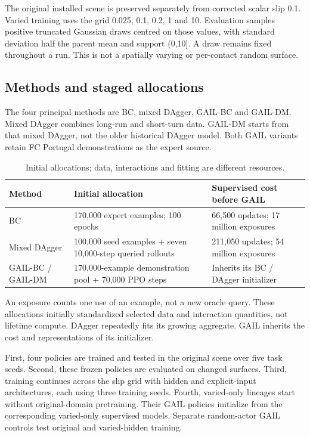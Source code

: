 \documentclass[conference]{IEEEtran}
\begin{document}
The original installed scene is preserved separately from corrected scalar slip 0.1. Varied training uses the grid 0.025, 0.1, 0.2, 1 and 10. Evaluation samples positive truncated Gaussian draws centred on those values, with standard deviation half the parent mean and support (0,10]. A draw remains fixed throughout a run. This is not a spatially varying or per-contact random surface.

\subsection{Methods and staged allocations}

The four principal methods are BC, mixed DAgger, GAIL-BC and GAIL-DM. Mixed DAgger combines long-run and short-turn data. GAIL-DM starts from that mixed DAgger, not the older historical DAgger model. Both GAIL variants retain FC Portugal demonstrations as the expert source.

\begin{table}[t]\centering\small
\caption{Initial allocations; data, interactions and fitting are different resources.}
\begin{tabularx}{\textwidth}{lXX}\toprule
Method & Initial allocation & Supervised cost before GAIL \\
\midrule
BC & 170,000 expert examples; 100 epochs & 66,500 updates; 17 million exposures \\
Mixed DAgger & 100,000 seed examples + seven 10,000-step queried rollouts & 211,050 updates; 54 million exposures \\
GAIL-BC / GAIL-DM & 170,000-example demonstration pool + 70,000 PPO steps & Inherits its BC / DAgger initializer \\
\bottomrule\end{tabularx}\end{table}

An exposure counts one use of an example, not a new oracle query. These allocations initially standardized selected data and interaction quantities, not lifetime compute. DAgger repeatedly fits its growing aggregate. GAIL inherits the cost and representations of its initializer.

First, four policies are trained and tested in the original scene over five task seeds. Second, these frozen policies are evaluated on changed surfaces. Third, training continues across the slip grid with hidden and explicit-input architectures, each using three training seeds. Fourth, varied-only lineages start without original-domain pretraining. Their GAIL policies initialize from the corresponding varied-only supervised models. Separate random-actor GAIL controls test original and varied-hidden training.
\end{document}
